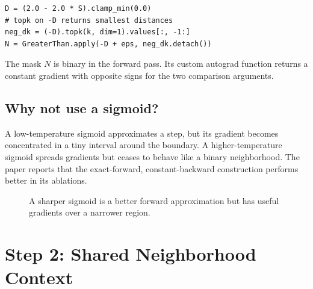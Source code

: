 \documentclass[11pt,oneside,openany]{book}
\theoremstyle{myplain}
\theoremstyle{definition}
\begin{document}
\begin{implementationbox}[title=Paper-to-code translation]
\begin{lstlisting}
D = (2.0 - 2.0 * S).clamp_min(0.0)
# topk on -D returns smallest distances
neg_dk = (-D).topk(k, dim=1).values[:, -1:]
N = GreaterThan.apply(-D + eps, neg_dk.detach())
\end{lstlisting}
The mask $N$ is binary in the forward pass. Its custom autograd function returns a constant gradient with opposite signs for the two comparison arguments.
\end{implementationbox}

\section{Why not use a sigmoid?}

A low-temperature sigmoid approximates a step, but its gradient becomes concentrated in a tiny interval around the boundary. A higher-temperature sigmoid spreads gradients but ceases to behave like a binary neighborhood. The paper reports that the exact-forward, constant-backward construction performs better in its ablations.

\begin{figure}[H]
\centering
{}
\caption{A sharper sigmoid is a better forward approximation but has useful gradients over a narrower region.}
\label{fig:sigmoid}
\end{figure}

\chapter{Step 2: Shared Neighborhood Context}
\label{chap:step2}
\end{document}
